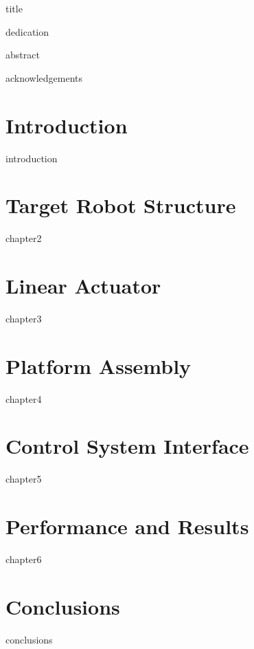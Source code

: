 \documentclass[a4paper,12pt,oneside]{book}
\begin{document}
\frontmatter

{title}

{dedication}
\normalsize

{abstract}

{acknowledgements}

\addbookmark{\contentsname}
\tableofcontents

\addcontent{\listfigurename}
\listoffigures

\addcontent{\listtablename}
\listoftables

\mainmatter

\chapter{Introduction}
{introduction}

\chapter{Target Robot Structure}
{chapter2}

\chapter{Linear Actuator}
{chapter3}

\chapter{Platform Assembly}
{chapter4}

\chapter{Control System Interface}
{chapter5}

\chapter{Performance and Results}
{chapter6}

\backmatter

\chapter{Conclusions}
{conclusions}
\end{document}
